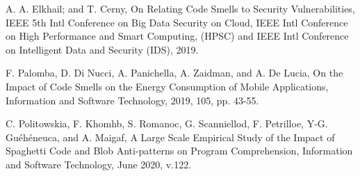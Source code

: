 \documentclass{sigchi}
\begin{document}
\begin{thebibliography}{2}
	 A. A. Elkhail; and T. Cerny, On Relating Code Smells to Security Vulnerabilities, IEEE 5th Intl Conference on Big Data Security on Cloud, IEEE Intl Conference on High Performance and Smart Computing, (HPSC) and IEEE Intl Conference on Intelligent Data and Security (IDS), 2019.
	
	F. Palomba, D. Di Nucci, A. Panichella, A. Zaidman, and A. De Lucia, On the Impact of Code Smells on the Energy Consumption of Mobile Applications, Information and Software Technology, 2019, 105, pp. 43-55.
	
	 C. Politowskia, F. Khomhb, S. Romanoc, G. Scanniellod, F. Petrilloe, Y-G. Guéhéneuca, and A. Maigaf, A Large Scale Empirical Study of the Impact of Spaghetti Code and Blob Anti-patterns on Program Comprehension, Information and Software Technology, June 2020, v.122.
	
	
\end{thebibliography}
\end{document}
